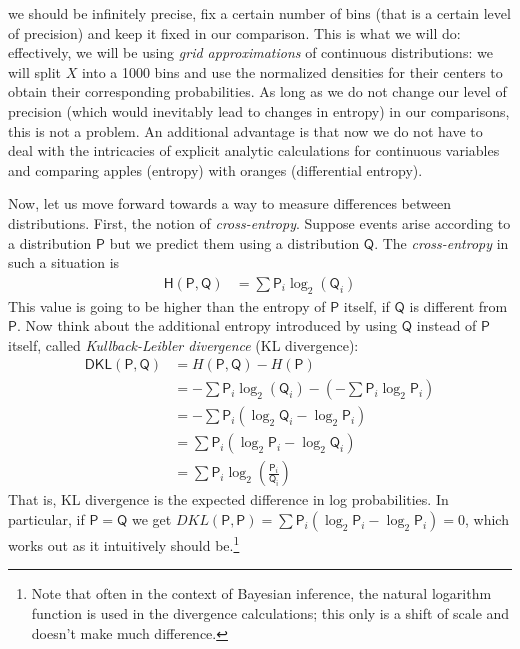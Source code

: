 \documentclass[
  10pt,
  dvipsnames,enabledeprecatedfontcommands]{scrartcl}
\begin{document}
we should be infinitely precise, fix a certain number of bins (that is a
certain level of precision) and keep it fixed in our comparison. This is
what we will do: effectively, we will be using
\emph{grid approximations} of continuous distributions: we will split
\(X\) into a 1000 bins and use the normalized densities for their
centers to obtain their corresponding probabilities. As long as we do
not change our level of precision (which would inevitably lead to
changes in entropy) in our comparisons, this is not a problem. An
additional advantage is that now we do not have to deal with the
intricacies of explicit analytic calculations for continuous variables
and comparing apples (entropy) with oranges (differential entropy).

Now, let us move forward towards a way to measure differences between
distributions. First, the notion of \emph{cross-entropy}. Suppose events
arise according to a distribution \(\mathsf{P}\) but we predict them
using a distribution \(\mathsf{Q}\). The \emph{cross-entropy} in such a
situation is \begin{align*}
\mathsf{H}(\mathsf{P}, \mathsf{Q}) & = \sum \mathsf{P}_i \log_2(\mathsf{Q}_i)
\end{align*} This value is going to be higher than the entropy of
\(\mathsf{P}\) itself, if \(\mathsf{Q}\) is different from
\(\mathsf{P}\). Now think about the additional entropy introduced by
using \(\mathsf{Q}\) instead of \(\mathsf{P}\) itself, called
\emph{Kullback-Leibler divergence} (KL divergence): \begin{align*}
\mathsf{DKL}(\mathsf{P}, \mathsf{Q}) & = H(\mathsf{P}, \mathsf{Q}) - H(\mathsf{P})\\
&= - \sum \mathsf{P}_i \log_2(\mathsf{Q}_i)  - \left(   - \sum \mathsf{P}_i \log_2 \mathsf{P}_i\right) \\
& = - \sum \mathsf{P}_i\left( \log_2 \mathsf{Q}_i - \log_2\mathsf{P}_i\right)\\
& =  \sum \mathsf{P}_i\left( \log_2 \mathsf{P}_i - \log_2\mathsf{Q}_i\right)\\
& = \sum \mathsf{P}_i \log_2 \left( \frac{\mathsf{P}_i}{\mathsf{Q_i}}\right)
\end{align*} \noindent  That is, KL divergence is the expected
difference in log probabilities. In particular, if
\(\mathsf{P}=\mathsf{Q}\) we get
\(DKL(\mathsf{P},\mathsf{P}) = \sum \mathsf{P}_i (\log_2 \mathsf{P}_i - \log_2 \mathsf{P}_i) = 0\),
which works out as it intuitively should be.\footnote{Note that often in
  the context of Bayesian inference, the natural logarithm function is
  used in the divergence calculations; this only is a shift of scale and
  doesn't make much difference.}
\end{document}

